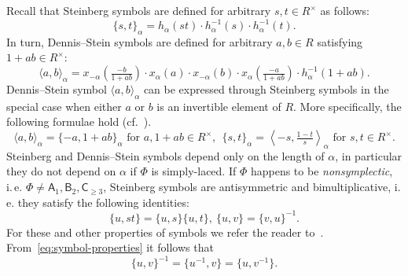 \documentclass[oneside, 8pt]{amsart}
\theoremstyle{remark}
\theoremstyle{definition}
\numberwithin{lemma}{section}
\numberwithin{prop}{section}
\numberwithin{corollary}{section}
\numberwithin{externaltheorem}{section}
\newcommand{\rA}{\mathsf{A}}
\newcommand{\rB}{\mathsf{B}}
\newcommand{\rC}{\mathsf{C}}
\numberwithin{equation}{section}
\begin{document}
Recall that Steinberg symbols are defined for arbitrary $s, t \in R^\times$ as follows:
\begin{equation} \label{eq:steinberg} \{ s, t \}_\alpha = h_\alpha(st) \cdot h_\alpha^{-1}(s) \cdot h_\alpha^{-1}(t). \end{equation}
In turn, Dennis--Stein symbols are defined for arbitrary $a, b\in R$ satisfying $1 + ab \in R^\times$:
\begin{equation} \label{eq:dennis-stein}  \langle a,b \rangle _ \alpha = x_{-\alpha}\left(\tfrac{- b}{1 + ab}\right) \cdot x_{\alpha}(a) \cdot x_{-\alpha}(b) \cdot x_{\alpha}\left(\tfrac{- a}{1+ab}\right) \cdot h_{\alpha}^{-1}(1 + ab). \end{equation} 
Dennis--Stein symbol $\langle a, b \rangle_\alpha$ can be expressed through Steinberg symbols in the special case when either $a$ or $b$ is an invertible element of $R$. More specifically, the following formulae hold (cf.~\cite[p.~250]{DS73}).
\begin{equation} \label{DS-S-relationship} \langle a, b \rangle_\alpha = \{-a, 1+ab\}_\alpha\text{ for } a, 1+ab\in R^\times,\ \
 \{ s, t \}_\alpha = \left\langle -s, \tfrac{1 - t}{s} \right\rangle_\alpha\text{ for } s, t\in R^\times. \end{equation}
Steinberg and Dennis--Stein symbols depend only on the length of $\alpha$, in particular they do not depend on $\alpha$ if $\Phi$ is simply-laced. If $\Phi$ happens to be {\it nonsymplectic}, i.\,e. $\Phi \neq \rA_1, \rB_2, \rC_{\geq 3}$, Steinberg symbols are antisymmetric and bimultiplicative, i.\,e. they satisfy the following identities: \begin{equation} \label{eq:symbol-properties} \{ u, st \} = \{ u, s\} \{ u, t \}, \ \{ u, v \} = \{ v, u\}^{-1}. \end{equation}
For these and other properties of symbols we refer the reader to~\cite{DS73}.
From~\eqref{eq:symbol-properties} it follows that
\begin{equation} \label{eq:symbol-inverse} \{u, v\}^{-1} = \{u^{-1}, v\} = \{u, v^{-1}\}. \end{equation}
\end{document}
